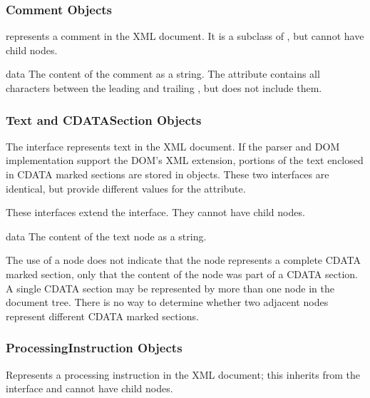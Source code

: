 \subsubsection{Comment Objects \label{dom-comment-objects}}

 represents a comment in the XML document.  It is a
subclass of , but cannot have child nodes.

\begin{memberdesc}[Comment]{data}
The content of the comment as a string.  The attribute contains all
characters between the leading \code{<!-}\code{-} and trailing
\code{-}\code{->}, but does not include them.
\end{memberdesc}


\subsubsection{Text and CDATASection Objects \label{dom-text-objects}}

The  interface represents text in the XML document.  If
the parser and DOM implementation support the DOM's XML extension,
portions of the text enclosed in CDATA marked sections are stored in
 objects.  These two interfaces are identical, but
provide different values for the  attribute.

These interfaces extend the  interface.  They cannot have
child nodes.

\begin{memberdesc}[Text]{data}
The content of the text node as a string.
\end{memberdesc}

  The use of a  node does not
indicate that the node represents a complete CDATA marked section,
only that the content of the node was part of a CDATA section.  A
single CDATA section may be represented by more than one node in the
document tree.  There is no way to determine whether two adjacent
 nodes represent different CDATA marked sections.


\subsubsection{ProcessingInstruction Objects \label{dom-pi-objects}}

Represents a processing instruction in the XML document; this inherits
from the  interface and cannot have child nodes.

